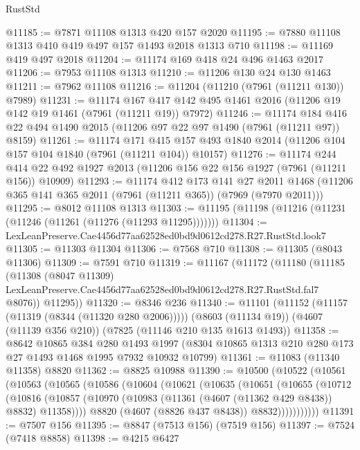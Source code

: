 \begin{lexlean}{RustStd}
\begin{coremodule}
@11185 := @7871 @11108 @1313 @420 @157 @2020
@11195 := @7880 @11108 @1313 @410 @419 @497 @157 @1493 @2018 @1313 @710
@11198 := @11169 @419 @497 @2018
@11204 := @11174 @169 @418 @24 @496 @1463 @2017
@11206 := @7953 @11108 @1313
@11210 := @11206 @130 @24 @130 @1463
@11211 := @7962 @11108
@11216 := @11204 (@11210 (@7961 (@11211 @130)) @7989)
@11231 := @11174
    @167
    @417
    @142
    @495
    @1461
    @2016
    (@11206 @19 @142 @19 @1461 (@7961 (@11211 @19)) @7972)
@11246 := @11174
    @184
    @416
    @22
    @494
    @1490
    @2015
    (@11206 @97 @22 @97 @1490 (@7961 (@11211 @97)) @8159)
@11261 := @11174
    @171
    @415
    @157
    @493
    @1840
    @2014
    (@11206 @104 @157 @104 @1840 (@7961 (@11211 @104)) @10157)
@11276 := @11174
    @244
    @414
    @22
    @492
    @1927
    @2013
    (@11206 @156 @22 @156 @1927 (@7961 (@11211 @156)) @10909)
@11293 := @11174
    @412
    @173
    @141
    @27
    @2011
    @1468
    (@11206 @365 @141 @365 @2011 (@7961 (@11211 @365)) (@7969 (@7970 @2011)))
@11295 := @8012 @11108 @1313
@11303 := @11195 (@11198 (@11216 (@11231 (@11246 (@11261 (@11276 (@11293 @11295)))))))
@11304 := LexLeanPreserve.Cae4456d77aa62528ed0bd9d0612cd278.R27.RustStd.look7
@11305 := @11303 @11304
@11306 := @7568 @710
@11308 := @11305 (@8043 @11306)
@11309 := @7591 @710
@11319 := @11167
    (@11172
      (@11180
        (@11185
          (@11308
            (@8047 @11309)
            LexLeanPreserve.Cae4456d77aa62528ed0bd9d0612cd278.R27.RustStd.fal7
            @8076))
        @11295))
@11320 := @8346 @236
@11340 := @11101
    (@11152 (@11157 (@11319 (@8344 (@11320 @280 @2006)))))
    (@8603 (@11134 @19))
    (@4607 (@11139 @356 @210))
    (@7825 (@11146 @210 @135 @1613 @1493))
@11358 := @8642
    @10865
    @384
    @280
    @1493
    @1997
    (@8304 @10865 @1313 @210 @280 @173 @27 @1493 @1468 @1995 @7932 @10932 @10799)
@11361 := @11083 (@11340 @11358) @8820
@11362 := @8825 @10988
@11390 := @10500
    (@10522
      (@10561
        (@10563
          (@10565
            (@10586
              (@10604
                (@10621
                  (@10635
                    (@10651
                      (@10655
                        (@10712
                          (@10816
                            (@10857
                              (@10970 (@10983 (@11361 (@4607 (@11362 @429 @8438)) @8832) @11358))))
                          @8820
                          (@4607 (@8826 @437 @8438))
                          @8832)))))))))))
@11391 := @7507 @156
@11395 := @8847 (@7513 @156) (@7519 @156)
@11397 := @7524 (@7418 @8858)
@11398 := @4215 @6427

\end{coremodule}
\end{lexlean}
